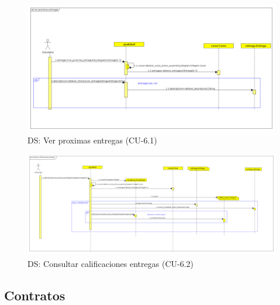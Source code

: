 \begin{figure}[H] %
\centering
\includegraphics[scale=0.27]{imagenes/diagramas/secuencia/analisis/ver_proximas_entregas.png}  %

\caption{DS: Ver proximas entregas (CU-6.1) }\label{figura91}

\end{figure}


\begin{figure}[H] %
\centering
\includegraphics[scale=0.19]{imagenes/diagramas/secuencia/analisis/consultar_calificaciones_entregas.png}  %

\caption{DS: Consultar calificaciones entregas (CU-6.2) }\label{figura92}

\end{figure}




\subsection{Contratos}
   
